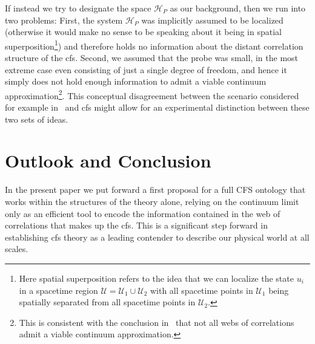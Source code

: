 \documentclass[reqno,11pt]{amsart}
\renewcommand{\H}{\mathcal{H}}
\numberwithin{equation}{section}
\begin{document}
If instead we  try to designate the space $\H_P$ as our background, then we run into
two problems: First, the system $\H_P$ was implicitly assumed to be localized (otherwise it would make no sense to be
speaking about it being in spatial superposition\footnote{
    Here spatial superposition refers to the idea that we can localize the state $u_i$ in a spacetime region
    $\mathcal{U} = \mathcal{U}_1 \cup \mathcal{U}_2$ with all spacetime points in $\mathcal{U}_1$ being spatially separated
    from all spacetime points in $\mathcal{U}_2$.
}) and therefore holds no information about the distant correlation structure of the \ac{cfs}.
Second, we assumed that the probe was small, in the most extreme case even consisting of just a single degree of freedom,
and hence it simply does not hold enough information to admit a viable continuum approximation\footnote{
    This is consistent with the conclusion in~\cite{reitz2023model} that not all webs of correlations admit a viable continuum approximation.
}.
This conceptual disagreement between the scenario considered for example in~\cite{zych2019bell} and \ac{cfs} might allow
for an experimental distinction between these two sets of ideas.
    
\section{Outlook and Conclusion}\label{sec:outlook}
In the present paper we put forward a first proposal for a full CFS ontology that works within the structures of the theory alone, relying on the continuum limit only as an efficient tool to encode the information contained in the web of correlations that makes up the \ac{cfs}. This is a significant step forward in establishing \ac{cfs} theory as a leading contender to describe our physical world at all scales. 
\end{document}
